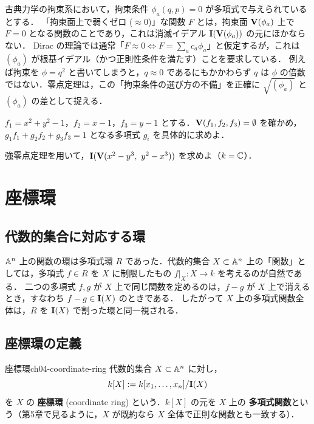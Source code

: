\begin{physbox}
古典力学の拘束系において，拘束条件 $\phi_a(q,p)=0$ が多項式で与えられているとする．
「拘束面上で弱くゼロ ($\approx0$)」な関数 $F$ とは，拘束面 $\mathbf{V}(\phi_a)$ 上で $F=0$ となる関数のことであり，これは消滅イデアル $\mathbf{I}(\mathbf{V}(\phi_a))$ の元にほかならない．
Dirac の理論では通常「$F\approx 0\iff F=\sum_a c_a\phi_a$」と仮定するが，これは $(\phi_a)$ が根基イデアル（かつ正則性条件を満たす）ことを要求している．
例えば拘束を $\phi=q^2$ と書いてしまうと，$q\approx0$ であるにもかかわらず $q$ は $\phi$ の倍数ではない．零点定理は，この「拘束条件の選び方の不備」を正確に $\sqrt{(\phi_a)}$ と $(\phi_a)$ の差として捉える．
\end{physbox}

 $f_1=x^2+y^2-1$，$f_2=x-1$，$f_3=y-1$ とする．$\mathbf{V}(f_1,f_2,f_3)=\emptyset$ を確かめ，$g_1f_1+g_2f_2+g_3f_3=1$ となる多項式 $g_i$ を具体的に求めよ．

 強零点定理を用いて，$\Ideal(\Zero(x^2-y^3,\ y^2-x^3))$ を求めよ（$k=\mathbb{C}$）．

\section{座標環}

\subsection{代数的集合に対応する環}

$\mathbb{A}^n$ 上の関数の環は多項式環 $R$ であった．代数的集合 $X\subset\mathbb{A}^n$ 上の「関数」としては，多項式 $f\in R$ を $X$ に制限したもの $f|_X\colon X\to k$ を考えるのが自然である．
二つの多項式 $f,g$ が $X$ 上で同じ関数を定めるのは，$f-g$ が $X$ 上で消えるとき，すなわち $f-g\in\mathbf{I}(X)$ のときである．
したがって $X$ 上の多項式関数全体は，$R$ を $\mathbf{I}(X)$ で割った環と同一視される．

\subsection{座標環の定義}

\begin{mydef}{座標環}{ch04-coordinate-ring}
代数的集合 $X\subset\mathbb{A}^n$ に対し，
\[
  k[X]:=k[x_1,\dots,x_n]/\mathbf{I}(X)
\]
を $X$ の \textbf{座標環} (coordinate ring) という．$k[X]$ の元を $X$ 上の \textbf{多項式関数}という（第5章で見るように，$X$ が既約なら $X$ 全体で正則な関数とも一致する）．
\end{mydef}

